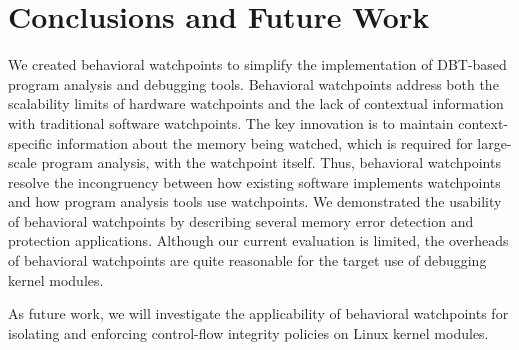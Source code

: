\documentclass[letterpaper,twocolumn,10pt]{article}
\begin{document}
\section{Conclusions and Future Work}

We created behavioral watchpoints to simplify the implementation of DBT-based program analysis and debugging tools. Behavioral watchpoints 
address both the scalability limits of hardware watchpoints and the lack of contextual information with traditional software watchpoints.  The key innovation is to maintain context-specific information about the memory being watched, which is required for large-scale program analysis, with the watchpoint itself.  Thus, behavioral watchpoints resolve the incongruency between how existing software implements watchpoints and how program analysis tools use watchpoints. We demonstrated the usability of behavioral watchpoints by describing several memory error detection and protection applications. Although our current evaluation is limited, the overheads of behavioral watchpoints
are quite reasonable for the target use of debugging kernel modules.

As future work, we will investigate the applicability of behavioral watchpoints for isolating and enforcing control-flow integrity policies on Linux kernel modules.








\end{document}
